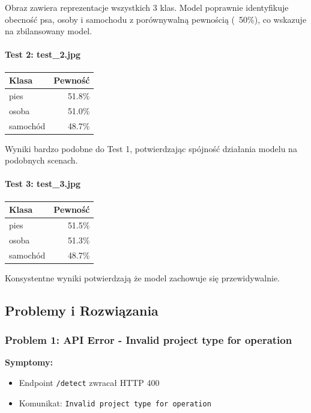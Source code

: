 Obraz zawiera reprezentacje wszystkich 3 klas. Model poprawnie identyfikuje obecność psa, osoby i samochodu z porównywalną pewnością (~50\%), co wskazuje na zbilansowany model.

\paragraph{Test 2: test\_2.jpg}

\begin{center}
	\begin{tabular}{|l|r|}
		\hline
		\textbf{Klasa} & \textbf{Pewność} \\
		\hline
		pies & 51.8\% \\
		osoba & 51.0\% \\
		samochód & 48.7\% \\
		\hline
	\end{tabular}
\end{center}

Wyniki bardzo podobne do Test 1, potwierdzając spójność działania modelu na podobnych scenach.

\paragraph{Test 3: test\_3.jpg}

\begin{center}
	\begin{tabular}{|l|r|}
		\hline
		\textbf{Klasa} & \textbf{Pewność} \\
		\hline
		pies & 51.5\% \\
		osoba & 51.3\% \\
		samochód & 48.7\% \\
		\hline
	\end{tabular}
\end{center}

Konsystentne wyniki potwierdzają że model zachowuje się przewidywalnie.

\subsection{Problemy i Rozwiązania}

\subsubsection{Problem 1: API Error - Invalid project type for operation}

\textbf{Symptomy:}
\begin{itemize}
	\item Endpoint \texttt{/detect} zwracał HTTP 400
	\item Komunikat: \texttt{Invalid project type for operation}
\end{itemize}

